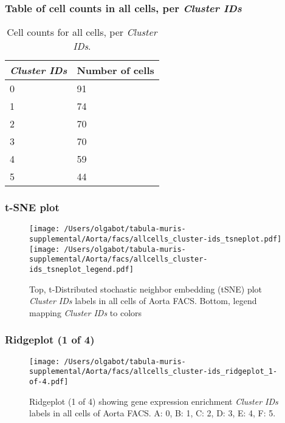 \subsubsection{Table of cell counts in all cells, per \emph{Cluster IDs}}\begin{table}[h]
\centering
\label{my-label}
\begin{tabular}{@{}ll@{}}
\toprule

\emph{Cluster IDs}& Number of cells \\ \midrule
0 & 91 \\

1 & 74 \\

2 & 70 \\

3 & 70 \\

4 & 59 \\

5 & 44 \\
\bottomrule
\end{tabular}
\caption{Cell counts for all cells, per \emph{Cluster IDs}.}
\end{table}

\clearpage
\subsubsection{t-SNE plot}
\begin{figure}[h]
\centering
\texttt{[image: /Users/olgabot/tabula-muris-supplemental/Aorta/facs/allcells\_cluster-ids\_tsneplot.pdf]}
\texttt{[image: /Users/olgabot/tabula-muris-supplemental/Aorta/facs/allcells\_cluster-ids\_tsneplot\_legend.pdf]}
\caption{Top, t-Distributed stochastic neighbor embedding (tSNE) plot  \emph{Cluster IDs} labels in all cells of Aorta FACS. Bottom, legend mapping \emph{Cluster IDs} to colors}
\end{figure}


\clearpage

\subsubsection{Ridgeplot (1 of 4)}
\begin{figure}[h]
\centering
\texttt{[image: /Users/olgabot/tabula-muris-supplemental/Aorta/facs/allcells\_cluster-ids\_ridgeplot\_1-of-4.pdf]}

\caption{ Ridgeplot (1 of 4)  showing gene expression enrichment \emph{Cluster IDs} labels in all cells of Aorta FACS. A: 0, B: 1, C: 2, D: 3, E: 4, F: 5.}
\end{figure}


